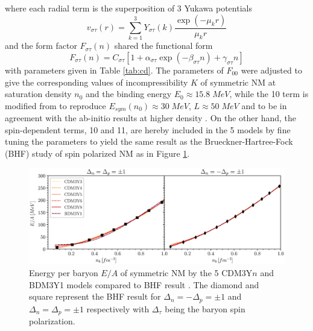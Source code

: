 where each radial term is the superposition of 3 Yukawa potentials
\begin{equation}
        v_{\sigma\tau}(r) = \sum^{3}_{k=1} Y_{\sigma\tau}(k) \frac{\exp(-\mu_k r)}{\mu_k r} 
\end{equation}
and the form factor $F_{\sigma\tau}(n)$ shared the functional form \citep{khoa1997nuclear,tan2020spin,tan2021equation,than2010ufr}
\begin{equation}
        F_{\sigma\tau}(n) = C_{\sigma\tau} [1 + \alpha_{\sigma\tau} \exp(-\beta_{\sigma\tau}n) + \gamma_{\sigma\tau}n]
\end{equation}
with parameters given in Table \ref{tab:cd}. The parameters of $F_{00}$ were adjusted to give the corresponding values of incompressibility $K$ of symmetric \gls{NM} at saturation density $n_0$ and the binding energy $E_0 \approx 15.8\; MeV$, while the 10 term is modified from \citep{than2010ufr} to reproduce $E_{sym}(n_0) \approx 30\;MeV$, $L\approx 50\;MeV$ and to be in agreement with the ab-initio results \citep{akmal1998equation,gandolfi2010microscopic} at higher density \citep{tan2021equation}. On the other hand, the spin-dependent terms, 10 and 11, are hereby included in the 5 models by fine tuning the parameters to yield the same result as the Brueckner-Hartree-Fock (\gls{BHF}) study of spin polarized \gls{NM} \citep{vidana2002equation} as in Figure \ref{fig:bhf}.

\begin{figure}[ht]
        \centering
        \includegraphics[width=\textwidth]{fig/BHF_fit.eps}
        \caption{Energy per baryon $E/A$ of symmetric \gls{NM} by the 5 CDM3Y$n$ and BDM3Y1 models compared to \gls{BHF} result \citep{vidana2002equation}. The diamond and square represent the \gls{BHF} result for $\Delta_n=-\Delta_p=\pm 1$ and $\Delta_n=\Delta_p=\pm 1$ respectively with $\Delta_\tau$ being the baryon spin polarization.}
        \label{fig:bhf}
\end{figure} 

